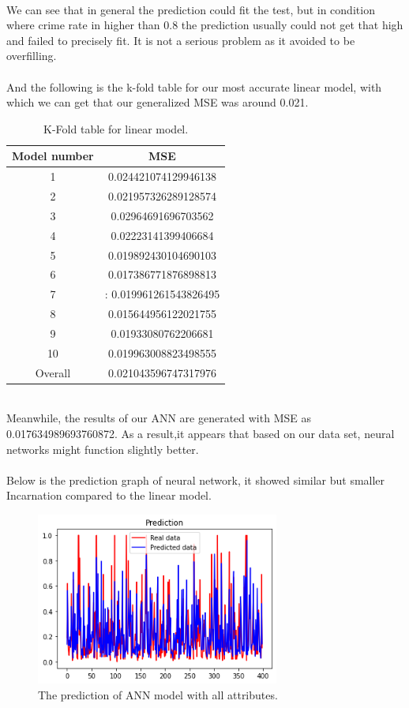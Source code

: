 \documentclass[letterpaper, 11 pt, conference]{article}
\begin{document}
\hspace*{\fill} 
\\
We can see that in general the prediction could fit the test, but in condition where crime rate in higher than 0.8 the prediction usually could not get that high and failed to precisely fit. It is not a serious problem as it avoided to be overfilling.
\\
\\And the following is the k-fold table for our most accurate linear model, with which we can get that our generalized MSE was around  0.021.
\begin{table}[H]
\centering
\begin{tabular}{ |c|c| } 
Model number & MSE \\\hline
1& 0.024421074129946138
\\2&0.021957326289128574
\\3&0.02964691696703562
\\4&0.02223141399406684
\\5& 0.019892430104690103
\\6& 0.017386771876898813
\\7&: 0.019961261543826495
\\8& 0.015644956122021755
\\9& 0.01933080762206681
\\10&0.019963008823498555
\\Overall & 0.021043596747317976
\end{tabular}
\caption{\label{tab:widgets}K-Fold table for linear model.}
\end{table}
\hspace*{\fill} 
\\Meanwhile, the results of our ANN are generated with MSE as 0.017634989693760872. As a result,it appears that based on our data set, neural networks might function slightly better.
\\
\\Below is the prediction graph of neural network, it showed similar but smaller Incarnation compared to the linear model. 
\begin{figure}[H]
\centering
\includegraphics[width=8cm]{pred_nn.png}
\caption{The prediction of ANN model with all attributes.}
\label{fig:hotbo}
\end{figure}
\end{document}
